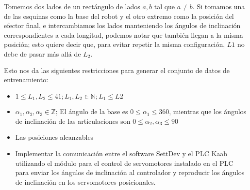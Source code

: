 Tomemos dos lados de un rectángulo de lados $a,b$ tal que $a \neq b$. Si tomamos una de las esquinas como la base del robot y el otro extremo como la posición del efector final, e intercambiamos los lados manteniendo los ángulos de inclinación correspondientes a cada longitud, podemos notar que también llegan a la misma posición; esto quiere decir que, para evitar repetir la misma configuración, $L1$ no debe de pasar más allá de $L_2$.

Esto nos da las siguientes restricciones para generar el conjunto de datos de entrenamiento:

\begin{itemize}
	
	\item $ 1 \leq L_1, L_2 \leq 41; L_1, L_2 \in \mathbb{N}; L_1 \leq L2$ 
	
	\item $\alpha_1, \alpha_2, \alpha_3 \in \mathbb{Z}$; El ángulo de la base es $ 0 \leq \alpha_1 \leq 360$, mientras que los ángulos de inclinación de las articulaciones son $ 0 \leq \alpha_2, \alpha_3 \leq 90$
	
	\item Las posiciones alcanzables 
	
	\item Implementar la comunicación entre el software SettDev y el PLC Kaab utilizando el módulo para el control de servomotores instalado en el PLC para enviar los ángulos de inclinación al controlador y reproducir los ángulos de inclinación en los servomotores posicionales.
	
\end{itemize}
